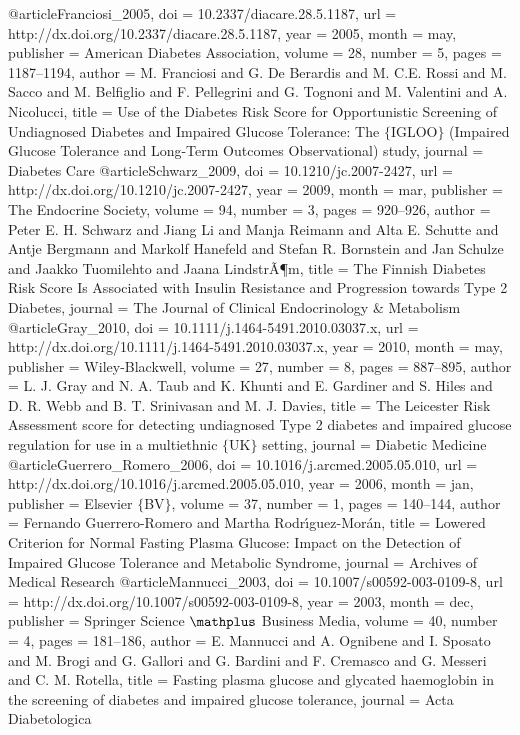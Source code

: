 @article{Franciosi_2005,
	doi = {10.2337/diacare.28.5.1187},
	url = {http://dx.doi.org/10.2337/diacare.28.5.1187},
	year = 2005,
	month = {may},
	publisher = {American Diabetes Association},
	volume = {28},
	number = {5},
	pages = {1187--1194},
	author = {M. Franciosi and G. De Berardis and M. C.E. Rossi and M. Sacco and M. Belfiglio and F. Pellegrini and G. Tognoni and M. Valentini and A. Nicolucci},
	title = {Use of the Diabetes Risk Score for Opportunistic Screening of Undiagnosed Diabetes and Impaired Glucose Tolerance: The $\lbrace$IGLOO$\rbrace$ (Impaired Glucose Tolerance and Long-Term Outcomes Observational) study},
	journal = {Diabetes Care}
}
@article{Schwarz_2009,
	doi = {10.1210/jc.2007-2427},
	url = {http://dx.doi.org/10.1210/jc.2007-2427},
	year = 2009,
	month = {mar},
	publisher = {The Endocrine Society},
	volume = {94},
	number = {3},
	pages = {920--926},
	author = {Peter E. H. Schwarz and Jiang Li and Manja Reimann and Alta E. Schutte and Antje Bergmann and Markolf Hanefeld and Stefan R. Bornstein and Jan Schulze and Jaakko Tuomilehto and Jaana LindstrÃ¶m},
	title = {The Finnish Diabetes Risk Score Is Associated with Insulin Resistance and Progression towards Type 2 Diabetes},
	journal = {The Journal of Clinical Endocrinology {\&} Metabolism}
}
@article{Gray_2010,
	doi = {10.1111/j.1464-5491.2010.03037.x},
	url = {http://dx.doi.org/10.1111/j.1464-5491.2010.03037.x},
	year = 2010,
	month = {may},
	publisher = {Wiley-Blackwell},
	volume = {27},
	number = {8},
	pages = {887--895},
	author = {L. J. Gray and N. A. Taub and K. Khunti and E. Gardiner and S. Hiles and D. R. Webb and B. T. Srinivasan and M. J. Davies},
	title = {The Leicester Risk Assessment score for detecting undiagnosed Type 2 diabetes and impaired glucose regulation for use in a multiethnic $\lbrace$UK$\rbrace$ setting},
	journal = {Diabetic Medicine}
}
@article{Guerrero_Romero_2006,
	doi = {10.1016/j.arcmed.2005.05.010},
	url = {http://dx.doi.org/10.1016/j.arcmed.2005.05.010},
	year = 2006,
	month = {jan},
	publisher = {Elsevier $\lbrace$BV$\rbrace$},
	volume = {37},
	number = {1},
	pages = {140--144},
	author = {Fernando Guerrero-Romero and Martha Rodr{\'{\i}}guez-Mor{\'{a}}n},
	title = {Lowered Criterion for Normal Fasting Plasma Glucose: Impact on the Detection of Impaired Glucose Tolerance and Metabolic Syndrome},
	journal = {Archives of Medical Research}
}
@article{Mannucci_2003,
	doi = {10.1007/s00592-003-0109-8},
	url = {http://dx.doi.org/10.1007/s00592-003-0109-8},
	year = 2003,
	month = {dec},
	publisher = {Springer Science $\mathplus$ Business Media},
	volume = {40},
	number = {4},
	pages = {181--186},
	author = {E. Mannucci and A. Ognibene and I. Sposato and M. Brogi and G. Gallori and G. Bardini and F. Cremasco and G. Messeri and C. M. Rotella},
	title = {Fasting plasma glucose and glycated haemoglobin in the screening of diabetes and impaired glucose tolerance},
	journal = {Acta Diabetologica}
}
